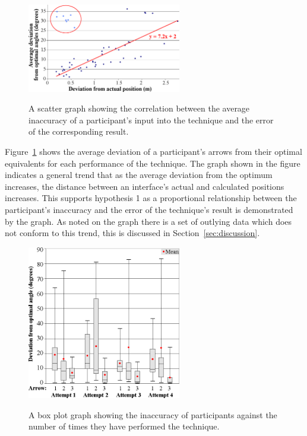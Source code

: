 \documentclass{bmcart}
\begin{document}
\begin{figure}[h]
   \centering
   \caption{A scatter graph showing the correlation between the average inaccuracy of a participant's input into the technique and the error of the corresponding result.}
   \includegraphics[width=0.6\textwidth]{figures/angle_deviation_scatter.png}
   \label{fig:scatter}
\end{figure}

Figure~\ref{fig:scatter} shows the average deviation of a participant's arrows from their optimal equivalents for each performance of the technique.
The graph shown in the figure indicates a general trend that as the average deviation from the optimum increases, the distance between an interface's actual and calculated positions increases.
This supports hypothesis 1 as a proportional relationship between the participant's inaccuracy and the error of the technique's result is demonstrated by the graph.
As noted on the graph there is a set of outlying data which does not conform to this trend, this is discussed in Section~\ref{sec:discussion}.

\begin{figure}[h]
   \centering
   \caption{A box plot graph showing the inaccuracy of participants against the number of times they have performed the technique.}
   \includegraphics[width=0.6\textwidth]{figures/angle_deviation_boxplots.png}
   \label{fig:boxPlot}
\end{figure}
\end{document}
